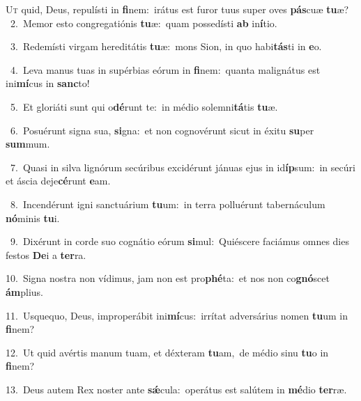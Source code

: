 \lettrine{\initial\textcolor{\initialcolor}{U}}{t} quid, Deus, repulísti in \textbf{fi}\-nem:~\star irátus est furor tuus super oves \textbf{pás}\-cuæ \textbf{tu}\-æ?\\
{\numbfont\textcolor{\numbcolor}{~2.}}~Memor esto congregatiónis \textbf{tu}\-æ:~\star quam possedísti \textbf{ab} in\-\textbf{í}\-tio.\par
{\numbfont\textcolor{\numbcolor}{~3.}}~Redemísti virgam hereditátis \textbf{tu}\-æ:~\star mons Sion, in quo habi\-\textbf{tás}\-ti in \textbf{e}\-o.\par
{\numbfont\textcolor{\numbcolor}{~4.}}~Leva manus tuas in supérbias eórum in \textbf{fi}\-nem:~\star quanta malignátus est ini\-\textbf{mí}\-cus in \textbf{sanc}\-to!\par
{\numbfont\textcolor{\numbcolor}{~5.}}~Et gloriáti sunt qui o\-\textbf{dé}\-runt te:~\star in médio solemni\-\textbf{tá}\-tis \textbf{tu}\-æ.\par
{\numbfont\textcolor{\numbcolor}{~6.}}~Posuérunt signa sua, \textbf{si}\-gna:~\star et non cognovérunt sicut in éxitu \textbf{su}\-per \textbf{sum}\-mum.\par
{\numbfont\textcolor{\numbcolor}{~7.}}~Quasi in silva lignórum secúribus excidérunt jánuas ejus in id\-\textbf{íp}\-sum:~\star in secúri et áscia deje\-\textbf{cé}\-runt \textbf{e}\-am.\par
{\numbfont\textcolor{\numbcolor}{~8.}}~Incendérunt igni sanctuárium \textbf{tu}\-um:~\star in terra polluérunt tabernáculum \textbf{nó}\-minis \textbf{tu}\-i.\par
{\numbfont\textcolor{\numbcolor}{~9.}}~Dixérunt in corde suo cognátio eórum \textbf{si}\-mul:~\star Quiéscere faciámus omnes dies festos \textbf{De}\-i a \textbf{ter}\-ra.\par
{\numbfont\textcolor{\numbcolor}{10.}}~Signa nostra non vídimus, jam non est pro\-\textbf{phé}\-ta:~\star et nos non co\-\textbf{gnó}\-scet \textbf{ám}\-plius.\par
{\numbfont\textcolor{\numbcolor}{11.}}~Usquequo, Deus, improperábit ini\-\textbf{mí}\-cus:~\star irrítat adversárius nomen \textbf{tu}\-um in \textbf{fi}\-nem?\par
{\numbfont\textcolor{\numbcolor}{12.}}~Ut quid avértis manum tuam, et déxteram \textbf{tu}\-am,~\star de médio sinu \textbf{tu}\-o in \textbf{fi}\-nem?\par
{\numbfont\textcolor{\numbcolor}{13.}}~Deus autem Rex noster ante \textbf{sǽ}\-cula:~\star operátus est salútem in \textbf{mé}\-dio \textbf{ter}\-ræ.\par
